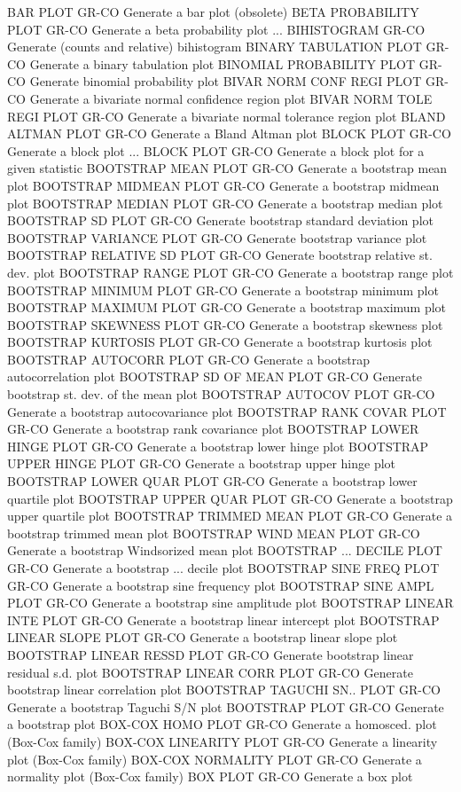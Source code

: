BAR PLOT                    GR-CO Generate a bar plot (obsolete)
BETA PROBABILITY PLOT       GR-CO Generate a beta probability plot
... BIHISTOGRAM             GR-CO Generate (counts and relative) bihistogram
BINARY TABULATION PLOT      GR-CO Generate a binary tabulation plot
BINOMIAL PROBABILITY PLOT   GR-CO Generate binomial probability plot
BIVAR NORM CONF REGI PLOT   GR-CO Generate a bivariate normal confidence region plot
BIVAR NORM TOLE REGI PLOT   GR-CO Generate a bivariate normal tolerance region plot
BLAND ALTMAN PLOT           GR-CO Generate a Bland Altman plot
BLOCK PLOT                  GR-CO Generate a block plot
... BLOCK PLOT              GR-CO Generate a block plot for a given statistic
BOOTSTRAP MEAN PLOT         GR-CO Generate a bootstrap mean plot
BOOTSTRAP MIDMEAN PLOT      GR-CO Generate a bootstrap midmean plot
BOOTSTRAP MEDIAN PLOT       GR-CO Generate a bootstrap median plot
BOOTSTRAP SD PLOT           GR-CO Generate bootstrap standard deviation plot
BOOTSTRAP VARIANCE PLOT     GR-CO Generate bootstrap variance plot
BOOTSTRAP RELATIVE SD PLOT  GR-CO Generate bootstrap relative st. dev. plot
BOOTSTRAP RANGE PLOT        GR-CO Generate a bootstrap range plot
BOOTSTRAP MINIMUM PLOT      GR-CO Generate a bootstrap minimum plot
BOOTSTRAP MAXIMUM PLOT      GR-CO Generate a bootstrap maximum plot
BOOTSTRAP SKEWNESS PLOT     GR-CO Generate a bootstrap skewness plot
BOOTSTRAP KURTOSIS PLOT     GR-CO Generate a bootstrap kurtosis plot
BOOTSTRAP AUTOCORR PLOT     GR-CO Generate a bootstrap autocorrelation plot
BOOTSTRAP SD OF MEAN PLOT   GR-CO Generate bootstrap st. dev. of the mean plot
BOOTSTRAP AUTOCOV PLOT      GR-CO Generate a bootstrap autocovariance plot
BOOTSTRAP RANK COVAR PLOT   GR-CO Generate a bootstrap rank covariance plot
BOOTSTRAP LOWER HINGE PLOT  GR-CO Generate a bootstrap lower hinge plot
BOOTSTRAP UPPER HINGE PLOT  GR-CO Generate a bootstrap upper hinge plot
BOOTSTRAP LOWER QUAR PLOT   GR-CO Generate a bootstrap lower quartile plot
BOOTSTRAP UPPER QUAR PLOT   GR-CO Generate a bootstrap upper quartile plot
BOOTSTRAP TRIMMED MEAN PLOT GR-CO Generate a bootstrap trimmed mean plot
BOOTSTRAP WIND MEAN PLOT    GR-CO Generate a bootstrap Windsorized mean plot
BOOTSTRAP ... DECILE PLOT   GR-CO Generate a bootstrap ... decile plot
BOOTSTRAP SINE FREQ PLOT    GR-CO Generate a bootstrap sine frequency plot
BOOTSTRAP SINE AMPL PLOT    GR-CO Generate a bootstrap sine amplitude plot
BOOTSTRAP LINEAR INTE PLOT  GR-CO Generate a bootstrap linear intercept plot
BOOTSTRAP LINEAR SLOPE PLOT GR-CO Generate a bootstrap linear slope plot
BOOTSTRAP LINEAR RESSD PLOT GR-CO Generate bootstrap linear residual s.d. plot
BOOTSTRAP LINEAR CORR PLOT  GR-CO Generate bootstrap linear correlation plot
BOOTSTRAP TAGUCHI SN.. PLOT GR-CO Generate a bootstrap Taguchi S/N plot
BOOTSTRAP PLOT              GR-CO Generate a bootstrap plot
BOX-COX HOMO PLOT           GR-CO Generate a homosced. plot (Box-Cox family)
BOX-COX LINEARITY PLOT      GR-CO Generate a linearity plot (Box-Cox family)
BOX-COX NORMALITY PLOT      GR-CO Generate a normality plot (Box-Cox family)
BOX PLOT                    GR-CO Generate a box plot

